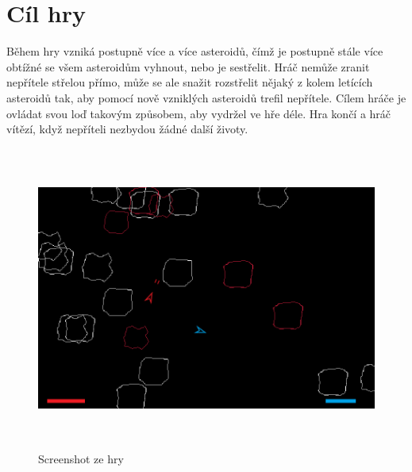 \section{Cíl hry}
Během hry vzniká postupně více a více asteroidů, čímž je postupně stále více obtížné se všem asteroidům vyhnout, nebo je sestřelit.
Hráč nemůže zranit nepřítele střelou přímo, může se ale snažit rozstřelit nějaký z kolem letících asteroidů tak, aby pomocí nově vzniklých asteroidů trefil nepřítele.
Cílem hráče je ovládat svou loď takovým způsobem, aby vydržel ve hře déle. Hra končí a hráč vítězí, když nepříteli nezbydou žádné další životy.

\begin{figure}[p]\centering
\includegraphics[width=150mm, height=100mm]{./Obrazky/UkazkaHry.png}
\caption{Screenshot ze hry}
\label{obr01:}
\end{figure}